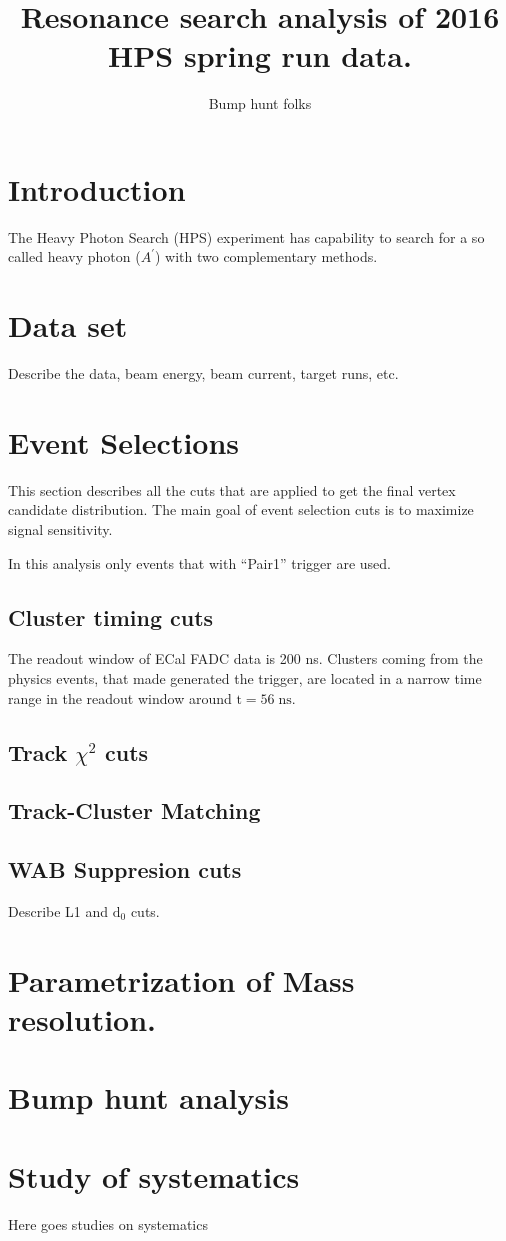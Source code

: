 \documentclass[letterpaper,12pt]{article}
\author{Bump hunt folks}
\title{Resonance search analysis of 2016 HPS spring run data.}
\begin{document}
\maketitle

\tableofcontents
\newpage

\section*{Introduction}

The Heavy Photon Search (HPS) experiment has capability to search for a so called heavy photon ($A^{\prime}$) with two complementary methods.


\section{Data set}
Describe the data, beam energy, beam current, target runs, etc.

\section{Event Selections}
This section describes all the cuts that are applied to get the final vertex candidate distribution. 
The main goal of event selection cuts is to maximize signal sensitivity.

In this analysis only events that with ``Pair1'' trigger are used.

\subsection{Cluster timing cuts}

The readout window of ECal FADC data is 200 ns. Clusters coming from the physics events, that made generated the trigger, are located in a narrow time range in the readout window around $\mathrm{t = 56\; ns}$.


\subsection{Track $\chi^{2}$ cuts}
\subsection{Track-Cluster Matching}
\subsection{WAB Suppresion cuts}
Describe L1 and $\mathrm{d_{0}}$ cuts.

\section{Parametrization of Mass resolution.}

\section{Bump hunt analysis}


\section{Study of systematics}
Here goes studies on systematics

 
\end{document}
